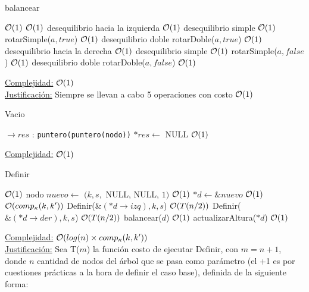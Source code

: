 \begin{Algoritmos}
\begin{algorithm}
\caption{balancear}
\begin{algorithmic}[1]
	\Comment $\mathcal{O}(1)$
 		\Comment $\mathcal{O}(1)$
 				\Comment desequilibrio hacia la izquierda $\mathcal{O}(1)$
 		   		\Comment desequilibrio simple $\mathcal{O}(1)$
 		   		\State rotarSimple($a, true$)
 		   		\Comment $\mathcal{O}(1)$
 		   	\Else \Comment desequilibrio doble
 		   		\State rotarDoble($a, true$)
 		   		\Comment $\mathcal{O}(1)$
 		   	\EndIf			
			\EndIf	
			\Else
				\Comment desequilibrio hacia la derecha $\mathcal{O}(1)$
 		   		\Comment desequilibrio simple $\mathcal{O}(1)$
 		   		\State rotarSimple($a, false$)
 		   		\Comment $\mathcal{O}(1)$
 		   	\Else \Comment desequilibrio doble
 		   		\State rotarDoble($a, false$)
 		   		\Comment $\mathcal{O}(1)$
 		   	\EndIf
			\EndIf
		\EndIf
  \EndIf
\EndProcedure
\end{algorithmic}
\underline{Complejidad:} $\mathcal{O}(1)$ \\
\underline{Justificación:} Siempre se llevan a cabo 5 operaciones con costo $\mathcal{O}(1)$
\end{algorithm}

\begin{algorithm}
\caption{Vacio}
\begin{algorithmic}[1]
$\to res$ : \texttt{puntero(puntero(nodo))}
	\State $*res \gets$ NULL
	\Comment $\mathcal{O}(1)$
\EndProcedure
\end{algorithmic}
\underline{Complejidad:} $\mathcal{O}(1)$
\end{algorithm}

\begin{algorithm}
\caption{Definir}
\begin{algorithmic}[1]
	\Comment $\mathcal{O}(1)$
    \State nodo $nuevo \gets$ $(k, s,$ NULL, NULL, $1)$
    \Comment $\mathcal{O}(1)$
    \State $*d \gets \&nuevo$
    \Comment $\mathcal{O}(1)$
  \Else
		\Comment $\mathcal{O}(comp_{\kappa}(k, k'))$
			\State Definir($\&(*d\to izq), k, s$)
			\Comment $\mathcal{O}(T(n/2))$
		\Else
			\State Definir($\&(*d\to der), k, s$)
			\Comment $\mathcal{O}(T(n/2))$
		\EndIf
  \EndIf
  \State balancear($d$)
  \Comment $\mathcal{O}(1)$
  \State actualizarAltura($*d$)
  \Comment $\mathcal{O}(1)$
\EndProcedure
\end{algorithmic}
\underline{Complejidad:} $\mathcal{O}(log(n) \times comp_{\kappa}(k, k'))$ \\
\underline{Justificación:} Sea T($m$) la función costo de ejecutar Definir, con $m = n + 1$, donde $n$ cantidad de nodos del árbol que se pasa como parámetro (el +1 es por cuestiones prácticas a la hora de definir el caso base), definida de la siguiente forma:


\end{algorithm}
\end{Algoritmos}
